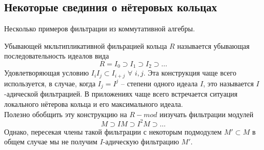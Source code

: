 \documentclass[../main.tex]{subfiles}
\begin{document}
\subsection{Некоторые свединия о нётеровых кольцах}
Несколько примеров фильтрации из коммутативной алгебры.
\begin{to_ex}
Убывающей мкльтипликативной фильрацией кольца $R$ называется убывающая последовательность идеалов вида 
\[
R = I_0 \supset I_1 \supset I_2 \supset \ldots
\]
Удовлетворяющая условию $I_i I_j \subset I_{i+j}$ $\forall$ $i, j$.
Эта конструкция чаще всего используется, в случае, когда $I_j = I^j$ -- степени одного идеала $I$, это называется $I$-адической фильтрацией. В приложениях чаще всего встречается ситуация локального нётерова кольца 
 и его максимального идеала.\\
 Полезно обобщить эту конструкцию на $R-mod$  иизучать фильтрации модулей
 \[M \supset IM \supset I^2 M \supset \ldots\]
 Однако, пересекая члены такой фильтрации с некоторым подмодулем $M' \subset M$ в общем случае мы не получим $I$-адическую фильтрацию $M'$.
\end{to_ex}
\end{document}
